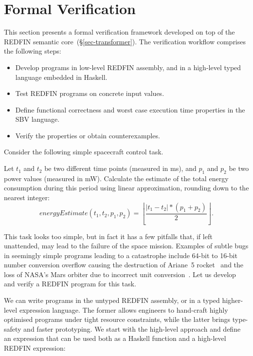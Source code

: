 \section{Formal Verification\label{sec-verification}}

This section presents a formal verification framework developed on top of
the REDFIN semantic core~(\S\ref{sec-transformer}). The verification workflow
comprises the following steps:

\vspace{1mm}
\begin{itemize}
    \item Develop programs in low-level REDFIN assembly, and in a high-level
    typed language embedded in Haskell.
    \item Test REDFIN programs on concrete input values.
    \item Define functional correctness and worst case execution time properties
    in the SBV language.
    \item Verify the properties or obtain counterexamples.
\end{itemize}
\vspace{1mm}

\noindent
Consider the following simple spacecraft control task.

\vspace{1mm}
\begin{tcolorbox}
Let $t_1$ and $t_2$ be two different time points (measured in ms),
and $p_1$ and $p_2$ be two power values (measured in mW).
Calculate the estimate of the total energy consumption during this period
using linear approximation, rounding down to the nearest integer:
\[
\textit{energyEstimate}(t_1, t_2, p_1, p_2) = \left\lfloor \frac{|t_1 - t_2| * (p_1 + p_2)}{2} \right\rfloor.
\]
\end{tcolorbox}
\vspace{1mm}

\noindent
This task looks too simple, but in fact it has a few pitfalls that,
if left unattended, may lead to the failure of the space mission. Examples
of subtle bugs in seemingly simple programs leading to a catastrophe include 64-bit
to 16-bit number conversion overflow causing the destruction of Ariane~5
rocket~\cite{bug-rocket} and the loss of NASA's Mars orbiter due to incorrect
unit conversion~\cite{NASA:1999:Mars}. Let us develop and verify
a REDFIN program for this task.

We can write programs in the untyped REDFIN assembly, or in a typed higher-level
expression language. The former allows engineers to hand-craft highly optimised
programs under tight resource constraints, while the latter brings type-safety
and faster prototyping. We start with the high-level approach and define an
expression that can be used both as a Haskell function and a high-level REDFIN
expression:

